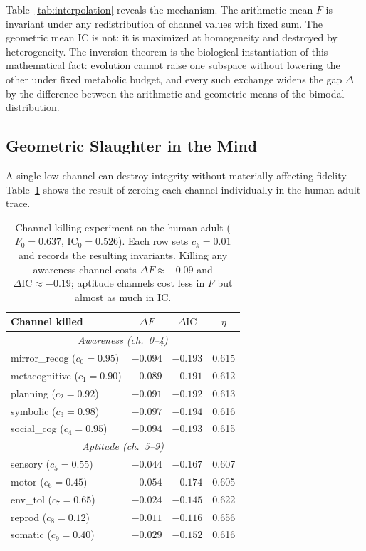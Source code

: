 \documentclass[
  aps,
  prd,
  twocolumn,
  superscriptaddress,
  nofootinbib,
  floatfix
]{revtex4-2}
\newcommand{\IC}{\mathrm{IC}}
\begin{document}
Table~\ref{tab:interpolation} reveals the mechanism.
The arithmetic mean $F$ is invariant under any redistribution
of channel values with fixed sum.  The geometric mean $\IC$
is not: it is maximized at homogeneity and destroyed by
heterogeneity.  The inversion theorem is the biological
instantiation of this mathematical fact: evolution
cannot raise one subspace without lowering the other under
fixed metabolic budget, and every such exchange widens the
gap $\Delta$ by the difference between the arithmetic and
geometric means of the bimodal distribution.

\subsection{Geometric Slaughter in the Mind}

A single low channel can destroy integrity without materially
affecting fidelity.  Table~\ref{tab:slaughter} shows the result
of zeroing each channel individually in the human adult trace.

\begin{table}[h]
\caption{\label{tab:slaughter}Channel-killing experiment on
the human adult ($F_0 = 0.637$, $\IC_0 = 0.526$).  Each row
sets $c_k = 0.01$ and records the resulting invariants.
Killing any awareness channel costs $\Delta F \approx -0.09$
and $\Delta\IC \approx -0.19$; aptitude channels cost less
in $F$ but almost as much in $\IC$.}
\begin{ruledtabular}
\begin{tabular}{lccc}
Channel killed & $\Delta F$ & $\Delta\IC$ & $\eta$ \\
\hline
\multicolumn{4}{c}{\emph{Awareness (ch.\ 0--4)}} \\
mirror\_recog ($c_0=0.95$) & $-0.094$ & $-0.193$ & 0.615 \\
metacognitive ($c_1=0.90$) & $-0.089$ & $-0.191$ & 0.612 \\
planning ($c_2=0.92$)      & $-0.091$ & $-0.192$ & 0.613 \\
symbolic ($c_3=0.98$)      & $-0.097$ & $-0.194$ & 0.616 \\
social\_cog ($c_4=0.95$)   & $-0.094$ & $-0.193$ & 0.615 \\
\hline
\multicolumn{4}{c}{\emph{Aptitude (ch.\ 5--9)}} \\
sensory ($c_5=0.55$)       & $-0.044$ & $-0.167$ & 0.607 \\
motor ($c_6=0.45$)         & $-0.054$ & $-0.174$ & 0.605 \\
env\_tol ($c_7=0.65$)      & $-0.024$ & $-0.145$ & 0.622 \\
reprod ($c_8=0.12$)        & $-0.011$ & $-0.116$ & 0.656 \\
somatic ($c_9=0.40$)       & $-0.029$ & $-0.152$ & 0.616 \\
\end{tabular}
\end{ruledtabular}
\end{table}
\end{document}
